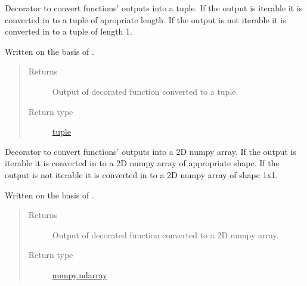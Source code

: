 \documentclass[a4paper,10pt,english]{sphinxmanual}
\begin{document}

\begin{fulllineitems}
\label{aqueduct.utils.helpers:aqueduct.utils.helpers.tupleify}
Decorator to convert functions' outputs into a tuple. If the output is iterable it is converted in to a tuple
of apropriate length. If the output is not iterable it is converted in to a tuple of length 1.

Written on the basis of {\hyperref[aqueduct.utils.helpers:aqueduct.utils.helpers.listify]{}}.
\begin{quote}\begin{description}
\item[{Returns}] \leavevmode
Output of decorated function converted to a tuple.

\item[{Return type}] \leavevmode
\href{https://docs.python.org/2/library/functions.html\#tuple}{tuple}

\end{description}\end{quote}

\end{fulllineitems}


\begin{fulllineitems}
\label{aqueduct.utils.helpers:aqueduct.utils.helpers.arrayify}
Decorator to convert functions' outputs into a 2D numpy array. If the output is iterable it is converted in to a 2D numpy array
of appropriate shape. If the output is not iterable it is converted in to a 2D numpy array of shape 1x1.

Written on the basis of {\hyperref[aqueduct.utils.helpers:aqueduct.utils.helpers.listify]{}}.
\begin{quote}\begin{description}
\item[{Returns}] \leavevmode
Output of decorated function converted to a 2D numpy array.

\item[{Return type}] \leavevmode
\href{http://docs.scipy.org/doc/numpy/reference/generated/numpy.ndarray.html\#numpy.ndarray}{numpy.ndarray}

\end{description}\end{quote}

\end{fulllineitems}
\end{document}
